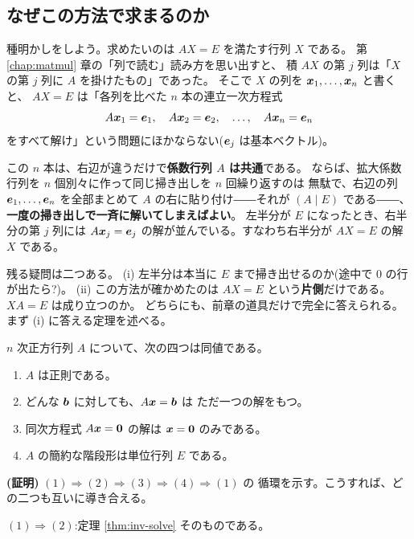 \subsection*{なぜこの方法で求まるのか}

種明かしをしよう。求めたいのは $AX = E$ を満たす行列 $X$ である。
第 \ref{chap:matmul} 章の「列で読む」読み方を思い出すと、
積 $AX$ の第 $j$ 列は「$X$ の第 $j$ 列に $A$ を掛けたもの」であった。
そこで $X$ の列を $\bm{x}_1, \dots, \bm{x}_n$ と書くと、
$AX = E$ は「各列を比べた $n$ 本の連立一次方程式
\[
A\bm{x}_1 = \bm{e}_1, \quad A\bm{x}_2 = \bm{e}_2,
\quad \dots, \quad A\bm{x}_n = \bm{e}_n
\]
をすべて解け」という問題にほかならない($\bm{e}_j$ は基本ベクトル)。

この $n$ 本は、右辺が違うだけで\textbf{係数行列 $A$ は共通}である。
ならば、拡大係数行列を $n$ 個別々に作って同じ掃き出しを $n$ 回繰り返すのは
無駄で、右辺の列 $\bm{e}_1, \dots, \bm{e}_n$ を全部まとめて
$A$ の右に貼り付け――それが $(A \mid E)$ である――、
\textbf{一度の掃き出しで一斉に解いてしまえばよい}。
左半分が $E$ になったとき、右半分の第 $j$ 列には
$A\bm{x}_j = \bm{e}_j$ の解が並んでいる。すなわち右半分が
$AX = E$ の解 $X$ である。

残る疑問は二つある。
(i) 左半分は本当に $E$ まで掃き出せるのか(途中で $0$ の行が出たら?)。
(ii) この方法が確かめたのは $AX = E$ という\textbf{片側}だけである。
$XA = E$ は成り立つのか。
どちらにも、前章の道具だけで完全に答えられる。まず (i) に答える定理を述べる。

\begin{teiri}[正則性の特徴づけ]\label{thm:inv-equiv}
$n$ 次正方行列 $A$ について、次の四つは同値である。
\begin{enumerate}
\item $A$ は正則である。
\item どんな $\bm{b}$ に対しても、$A\bm{x} = \bm{b}$ は
ただ一つの解をもつ。
\item 同次方程式 $A\bm{x} = \bm{0}$ の解は $\bm{x} = \bm{0}$ のみである。
\item $A$ の簡約な階段形は単位行列 $E$ である。
\end{enumerate}
\end{teiri}

\noindent\textbf{(証明)}\quad
$(1) \Rightarrow (2) \Rightarrow (3) \Rightarrow (4) \Rightarrow (1)$ の
循環を示す。こうすれば、どの二つも互いに導き合える。

$(1) \Rightarrow (2)$:定理 \ref{thm:inv-solve} そのものである。

